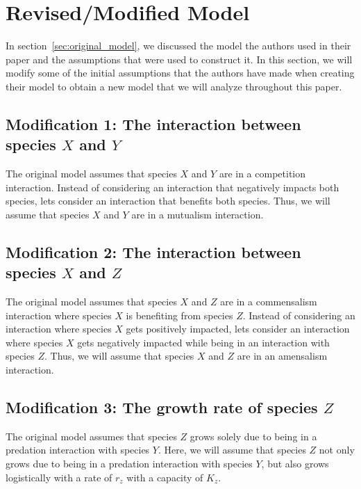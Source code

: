 \section{Revised/Modified Model}\label{sec:modified_model}
In section~\ref{sec:original_model}, we discussed the model the authors used in their paper and the assumptions that were used to construct it. In this section, we will modify some of the initial assumptions that the authors have made when creating their model to obtain a new model that we will analyze throughout this paper.

\subsection{Modification 1: The interaction between species $X$ and $Y$}\label{subsec:modification_1}
The original model assumes that species $X$ and $Y$ are in a competition interaction. Instead of considering an interaction that negatively impacts both species, lets consider an interaction that benefits both species. Thus, we will assume that species $X$ and $Y$ are in a mutualism interaction.

\subsection{Modification 2: The interaction between species $X$ and $Z$}\label{subsec:modification_2}
The original model assumes that species $X$ and $Z$ are in a commensalism interaction where species $X$ is benefiting from species $Z$. Instead of considering an interaction where species $X$ gets positively impacted, lets consider an interaction where species $X$ gets negatively impacted while being in an interaction with species $Z$. Thus, we will assume that species $X$ and $Z$ are in an amensalism interaction.

\subsection{Modification 3: The growth rate of species $Z$}\label{subsec:modification_3}
The original model assumes that species $Z$ grows solely due to being in a predation interaction with species $Y$. Here, we will assume that species $Z$ not only grows due to being in a predation interaction with species $Y$, but also grows logistically with a rate of $r_z$ with a capacity of $K_z$.

